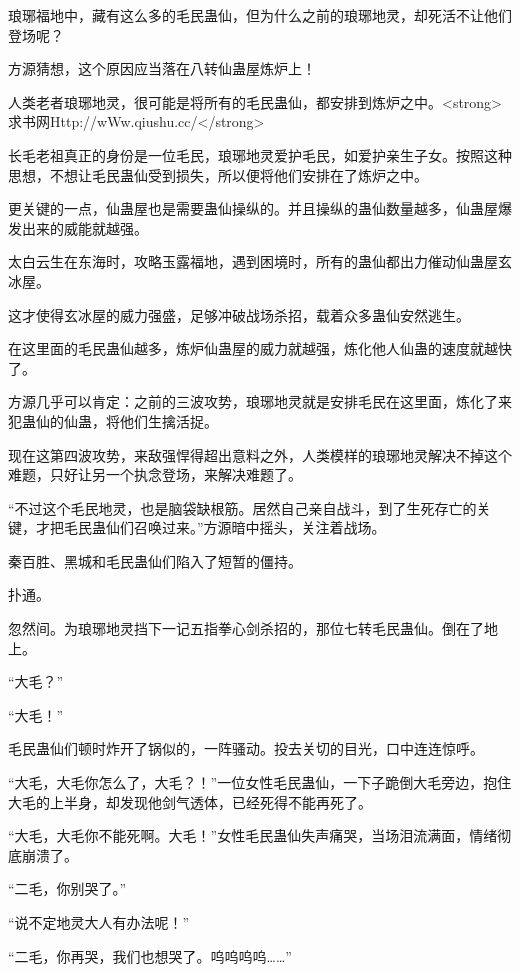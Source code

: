 
\begin{this_body}

琅琊福地中，藏有这么多的毛民蛊仙，但为什么之前的琅琊地灵，却死活不让他们登场呢？

方源猜想，这个原因应当落在八转仙蛊屋炼炉上！

人类老者琅琊地灵，很可能是将所有的毛民蛊仙，都安排到炼炉之中。<strong>求书网Http://wWw.qiushu.cc/</strong>

长毛老祖真正的身份是一位毛民，琅琊地灵爱护毛民，如爱护亲生子女。按照这种思想，不想让毛民蛊仙受到损失，所以便将他们安排在了炼炉之中。

更关键的一点，仙蛊屋也是需要蛊仙操纵的。并且操纵的蛊仙数量越多，仙蛊屋爆发出来的威能就越强。

太白云生在东海时，攻略玉露福地，遇到困境时，所有的蛊仙都出力催动仙蛊屋玄冰屋。

这才使得玄冰屋的威力强盛，足够冲破战场杀招，载着众多蛊仙安然逃生。

在这里面的毛民蛊仙越多，炼炉仙蛊屋的威力就越强，炼化他人仙蛊的速度就越快了。

方源几乎可以肯定：之前的三波攻势，琅琊地灵就是安排毛民在这里面，炼化了来犯蛊仙的仙蛊，将他们生擒活捉。

现在这第四波攻势，来敌强悍得超出意料之外，人类模样的琅琊地灵解决不掉这个难题，只好让另一个执念登场，来解决难题了。

“不过这个毛民地灵，也是脑袋缺根筋。居然自己亲自战斗，到了生死存亡的关键，才把毛民蛊仙们召唤过来。”方源暗中摇头，关注着战场。

秦百胜、黑城和毛民蛊仙们陷入了短暂的僵持。

扑通。

忽然间。为琅琊地灵挡下一记五指拳心剑杀招的，那位七转毛民蛊仙。倒在了地上。

“大毛？”

“大毛！”

毛民蛊仙们顿时炸开了锅似的，一阵骚动。投去关切的目光，口中连连惊呼。

“大毛，大毛你怎么了，大毛？！”一位女性毛民蛊仙，一下子跪倒大毛旁边，抱住大毛的上半身，却发现他剑气透体，已经死得不能再死了。

“大毛，大毛你不能死啊。大毛！”女性毛民蛊仙失声痛哭，当场泪流满面，情绪彻底崩溃了。

“二毛，你别哭了。”

“说不定地灵大人有办法呢！”

“二毛，你再哭，我们也想哭了。呜呜呜呜……”


\end{this_body}
